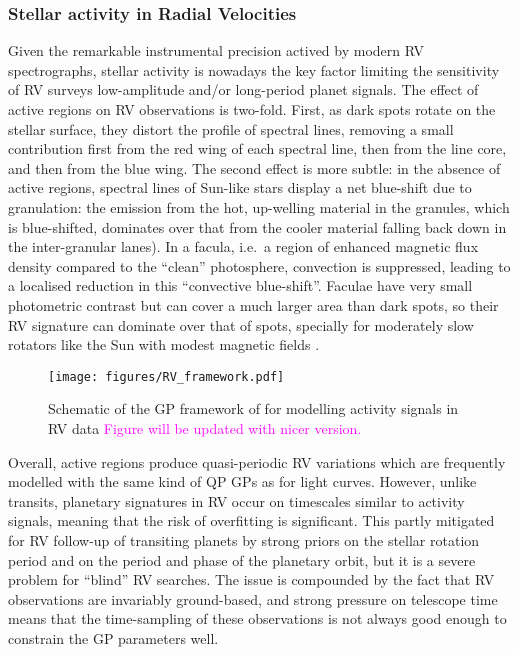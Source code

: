\documentclass[letterpaper]{ar-1col}
\newcommand{\suz}[1]{\textcolor{magenta}{#1}}
\begin{document}
\subsubsection{Stellar activity in Radial Velocities}
Given the remarkable instrumental precision actived by modern RV spectrographs, stellar activity is nowadays the key factor limiting the sensitivity of RV surveys low-amplitude and/or long-period planet signals. The effect of active regions on RV observations is two-fold. First, as dark spots rotate on the stellar surface, they distort the profile of spectral lines, removing a small contribution first from the red wing of each spectral line, then from the line core, and then from the blue wing. The second effect is more subtle: in the absence of active regions, spectral lines of Sun-like stars display a net blue-shift due to granulation: the emission from the hot, up-welling material in the granules, which is blue-shifted, dominates over that from the cooler material falling back down in the inter-granular lanes). In a facula, i.e.\ a region of enhanced magnetic flux density compared to the ``clean'' photosphere, convection is suppressed, leading to a localised reduction in this ``convective blue-shift''. Faculae have very small photometric contrast but can cover a much larger area than dark spots, so their RV signature can dominate over that of spots, specially for moderately slow rotators like the Sun with modest magnetic fields \citep{2010A&A...512A..39M}.

\begin{figure}[ht]
  \texttt{[image: figures/RV\_framework.pdf]}
  \caption{Schematic of the GP framework of \citet{2015MNRAS.452.2269R} for modelling activity signals in RV data \suz{Figure will be updated with nicer version.}}
  \label{fig:RV_framework}
\end{figure}

Overall, active regions produce quasi-periodic RV variations which are frequently modelled with the same kind of QP GPs as for light curves. However, unlike transits, planetary signatures in RV occur on timescales similar to activity signals, meaning that the risk of overfitting is significant. This partly mitigated for RV follow-up of transiting planets by strong priors on the stellar rotation period and on the period and phase of the planetary orbit, but it is a severe problem for ``blind'' RV searches. The issue is compounded by the fact that RV observations are invariably ground-based, and strong pressure on telescope time means that the time-sampling of these observations is not always good enough to constrain the GP parameters well.
\end{document}
